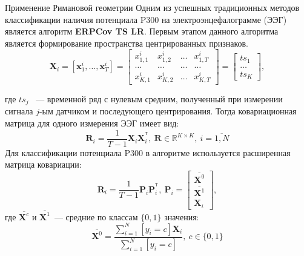 \documentclass[9pt,pdf]{beamer} %
\newcommand{\T}{^{\mathsf{T}}}
\begin{document}
\begin{frame}{Применение Римановой геометрии}
    Одним из успешных традиционных методов классификации наличия потенциала P300 на электроэнцефалограмме (ЭЭГ) является
    алгоритм \textbf{ERPCov TS LR}. 
    Первым этапом данного алгоритма является формирование пространства центрированных признаков.
    \begin{equation*}
	\bm{X}_i= \left[\bm{x}^i_1,\dots, \bm{x}^i_{T}\right] = 
	\begin{bmatrix}
	x^i_{1,1} & x^i_{1,2} &  \dots  &  x^i_{1,T}\\
	\dots & \dots &  \dots  &  \dots\\
	x^i_{K,1} & x^i_{K,2} &  \dots  &  x^i_{K,T}
	\end{bmatrix}
	= \begin{bmatrix}
		ts_1\\
		\dots\\
		ts_K
		\end{bmatrix},
	\end{equation*}

 где $ts_j$ ~--- временной ряд с нулевым средним, полученный при измерении сигнала $j$-ым датчиком и последующего центрирования.
 Тогда ковариационная матрица для одного измерения ЭЭГ имеет вид:
$$\bm{R}_i = \dfrac{1}{T-1}\bm{X}_i\bm{X}_i^{\T}, ~\bm{R} \in \mathbb{R}^{K\times K},~i = \overline{1, N}$$
Для классификации потенциала P300 в алгоритме используется расширенная матрица ковариации:
$$\bm{R}_i = \dfrac{1}{T-1} \bm{P}_i\bm{P}_i^{\T},~\bm{P}_i = \begin{bmatrix}
	\overline{\bm{X}^0}\\
	\overline{\bm{X}^1}\\
	\bm{X}_i
	\end{bmatrix},$$
где $\overline{\bm{X}^c}$ и $\overline{\bm{X}^1}$~--- средние по классам $\{0,1\}$ значения:
$$\overline{\bm{X}^0} = \dfrac{\sum_{i = 1}^N\left[y_i = c\right] \bm{X}_i}{\sum_{i = 1}^N\left[y_i = c\right]},~c\in\{0,1\}$$
\end{frame}
\end{document}
